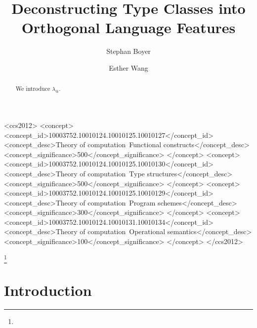 \documentclass[acmlarge]{acmart}
\makeatletter
\newcommand\lambdaarobase{\lambda_@}
\makeatother
\begin{document}
\title{Deconstructing Type Classes into Orthogonal Language Features}
\author{Stephan Boyer}
\author{Esther Wang}


\begin{abstract}
  We introduce $\lambdaarobase$.
\end{abstract}


%
\begin{CCSXML}
<ccs2012>
<concept>
<concept_id>10003752.10010124.10010125.10010127</concept_id>
<concept_desc>Theory of computation~Functional constructs</concept_desc>
<concept_significance>500</concept_significance>
</concept>
<concept>
<concept_id>10003752.10010124.10010125.10010130</concept_id>
<concept_desc>Theory of computation~Type structures</concept_desc>
<concept_significance>500</concept_significance>
</concept>
<concept>
<concept_id>10003752.10010124.10010125.10010129</concept_id>
<concept_desc>Theory of computation~Program schemes</concept_desc>
<concept_significance>300</concept_significance>
</concept>
<concept>
<concept_id>10003752.10010124.10010131.10010134</concept_id>
<concept_desc>Theory of computation~Operational semantics</concept_desc>
<concept_significance>100</concept_significance>
</concept>
</ccs2012>
\end{CCSXML}


%
%

\terms{}



\thanks{
}


\maketitle

\section{Introduction}
\end{document}
